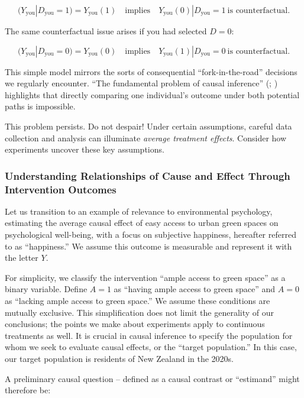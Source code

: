 \documentclass[
  singlecolumn]{article}
\begin{document}
\[
(Y_{\text{you}}|D_{\text{you}} = 1) = Y_{\text{you}}(1) \quad \text{implies} \quad Y_{\text{you}}(0)|D_{\text{you}} = 1~ \text{is counterfactual}.
\]

The same counterfactual issue arises if you had selected \(D = 0\):

\[
(Y_{\text{you}}|D_{\text{you}} = 0) = Y_{\text{you}}(0) \quad \text{implies} \quad Y_{\text{you}}(1)|D_{\text{you}} = 0~ \text{is counterfactual}.
\]

This simple model mirrors the sorts of consequential
``fork-in-the-road'' decisions we regularly encounter. ``The fundamental
problem of causal inference'' (;
) highlights that directly comparing
one individual's outcome under both potential paths is impossible.

This problem persists. Do not despair! Under certain assumptions,
careful data collection and analysis can illuminate \emph{average
treatment effects}. Consider how experiments uncover these key
assumptions.

\subsubsection{Understanding Relationships of Cause and Effect Through
Intervention
Outcomes}\label{understanding-relationships-of-cause-and-effect-through-intervention-outcomes}

Let us transition to an example of relevance to environmental
psychology, estimating the average causal effect of easy access to urban
green spaces on psychological well-being, with a focus on subjective
happiness, hereafter referred to as ``happiness.'' We assume this
outcome is measurable and represent it with the letter \(Y\).

For simplicity, we classify the intervention ``ample access to green
space'' as a binary variable. Define \(A = 1\) as ``having ample access
to green space'' and \(A = 0\) as ``lacking ample access to green
space.'' We assume these conditions are mutually exclusive. This
simplification does not limit the generality of our conclusions; the
points we make about experiments apply to continuous treatments as well.
It is crucial in causal inference to specify the population for whom we
seek to evaluate causal effects, or the ``target population.'' In this
case, our target population is residents of New Zealand in the 2020s.

A preliminary causal question -- defined as a causal contrast or
``estimand'' might therefore be:
\end{document}
